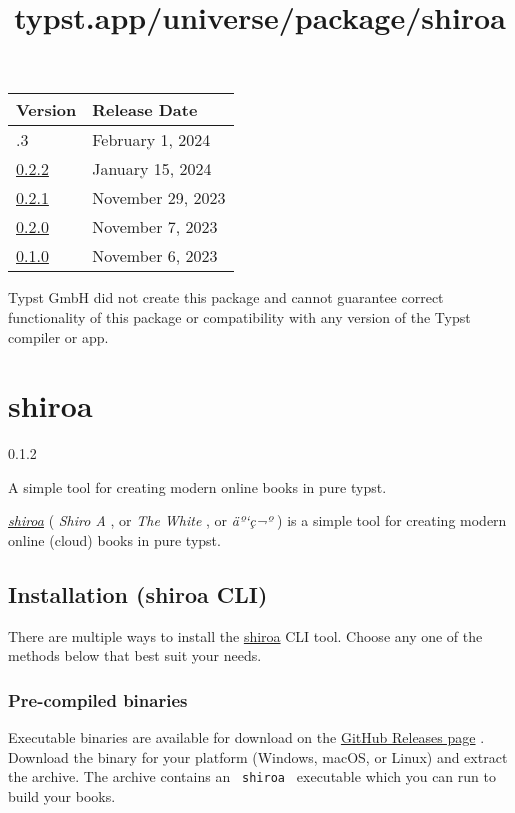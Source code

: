 \begin{longtable}[]{@{}ll@{}}
\toprule\noalign{}
Version & Release Date \\
\midrule\noalign{}
\endhead
\bottomrule\noalign{}
\endlastfoot
0.2.3 & February 1, 2024 \\
\href{https://typst.app/universe/package/jogs/0.2.2/}{0.2.2} & January
15, 2024 \\
\href{https://typst.app/universe/package/jogs/0.2.1/}{0.2.1} & November
29, 2023 \\
\href{https://typst.app/universe/package/jogs/0.2.0/}{0.2.0} & November
7, 2023 \\
\href{https://typst.app/universe/package/jogs/0.1.0/}{0.1.0} & November
6, 2023 \\
\end{longtable}

Typst GmbH did not create this package and cannot guarantee correct
functionality of this package or compatibility with any version of the
Typst compiler or app.


\title{typst.app/universe/package/shiroa}

\label{banner}
\section{shiroa}\label{shiroa}

{ 0.1.2 }

A simple tool for creating modern online books in pure typst.

\label{readme}
\href{https://github.com/Myriad-Dreamin/shiroa}{\emph{shiroa}} (
\emph{Shiro A} , or \emph{The White} , or \emph{äº`ç¬º} ) is a simple
tool for creating modern online (cloud) books in pure typst.

\subsection{Installation (shiroa CLI)}\label{installation-shiroa-cli}

There are multiple ways to install the
\href{https://github.com/Myriad-Dreamin/shiroa}{shiroa} CLI tool. Choose
any one of the methods below that best suit your needs.

\subsubsection{Pre-compiled binaries}\label{pre-compiled-binaries}

Executable binaries are available for download on the
\href{https://github.com/Myriad-Dreamin/shiroa/releases}{GitHub Releases
page} . Download the binary for your platform (Windows, macOS, or Linux)
and extract the archive. The archive contains an \texttt{\ shiroa\ }
executable which you can run to build your books.

